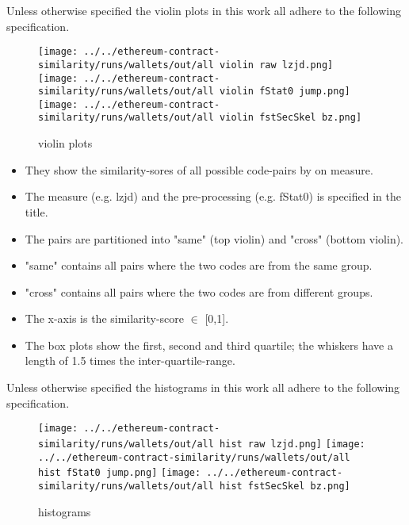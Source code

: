\documentclass[../main.tex]{subfiles}
\begin{document}
Unless otherwise specified the violin plots  in this work all adhere to the following specification.

\begin{figure}[ht!]
  \centering
  \texttt{[image: ../../ethereum-contract-similarity/runs/wallets/out/all violin raw lzjd.png]}%
  \texttt{[image: ../../ethereum-contract-similarity/runs/wallets/out/all violin fStat0 jump.png]}%
  \texttt{[image: ../../ethereum-contract-similarity/runs/wallets/out/all violin fstSecSkel bz.png]}%

  \caption{violin plots}
  \label{fig:violins}
\end{figure}

\begin{itemize}
  \item They show the similarity-sores of all possible code-pairs by on measure.
  \item The measure (e.g. lzjd) and the pre-processing (e.g. fStat0) is specified in the title.
  \item The pairs are partitioned into "same" (top violin) and "cross" (bottom violin).
  \item "same" contains all pairs where the two codes are from the same group.
  \item "cross" contains all pairs where the two codes are from different groups.
  \item The x-axis is the similarity-score \(\in\) [0,1].
  \item The box plots show the first, second and third quartile; the whiskers have a length of 1.5 times the inter-quartile-range.
\end{itemize}

Unless otherwise specified the histograms  in this work all adhere to the following specification.

\begin{figure}[ht!]
  \centering
  \texttt{[image: ../../ethereum-contract-similarity/runs/wallets/out/all hist raw lzjd.png]}%
  \texttt{[image: ../../ethereum-contract-similarity/runs/wallets/out/all hist fStat0 jump.png]}%
  \texttt{[image: ../../ethereum-contract-similarity/runs/wallets/out/all hist fstSecSkel bz.png]}%

  \caption{histograms}
  \label{fig:histograms}
\end{figure}
\end{document}
